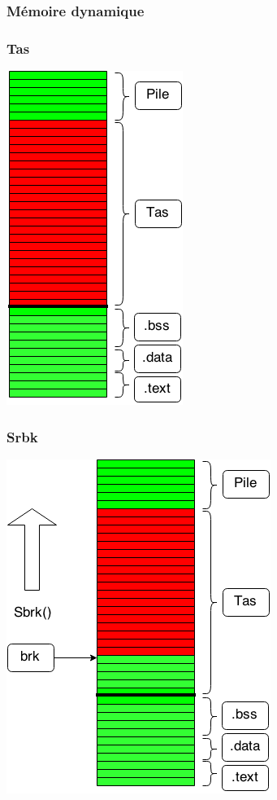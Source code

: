 \documentclass{beamer}
\begin{document}
\begin{frame}
  \frametitle{Mémoire dynamique}
\end{frame}

\begin{frame}
\frametitle{Tas}
\begin{center}
\includegraphics[scale=0.4]{tas.png}
\end{center}
\end{frame}

\begin{frame}
\frametitle{Srbk}
\begin{center}
\includegraphics[scale=0.4]{sbrk.png}
\end{center}
\end{frame}
\end{document}

